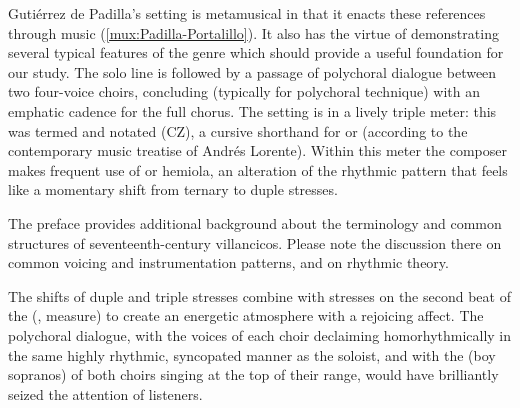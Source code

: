 
Gutiérrez de Padilla's setting is metamusical in that it enacts these
references through music (\cref{mux:Padilla-Portalillo}).
It also has the virtue of demonstrating several typical features of the genre
which should provide a useful foundation for our study.
The solo line is followed by a passage of polychoral dialogue between two
four-voice choirs, concluding (typically for polychoral technique) with an
emphatic cadence for the full chorus.  
The setting is in a lively triple meter: this was termed  and notated \meterCZ{} (CZ), a cursive shorthand for
\meterCThreeTwo{} or \meterCThree{} (according to the contemporary music
treatise of Andrés Lorente).%
    \citXXX[Lorente]
Within this meter the composer makes frequent use of  or
hemiola, an alteration of the rhythmic pattern that feels like a momentary
shift from ternary to duple stresses.%
\begin{Footnote}
    The preface provides additional background about the terminology and common structures of seventeenth-century villancicos.
    Please note the discussion there on common voicing and instrumentation patterns, and on rhythmic theory.
\end{Footnote}
The shifts of duple and triple stresses combine with stresses on the second
beat of the  (, measure) to create an energetic
atmosphere with a rejoicing affect.  
The polychoral dialogue, with the voices of each choir declaiming
homorhythmically in the same highly rhythmic, syncopated manner as the soloist,
and with the  (boy sopranos) of both choirs singing at the top of
their range, would have brilliantly seized the attention of listeners.

